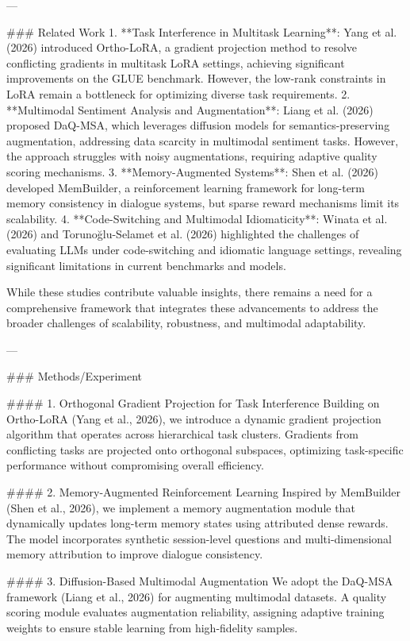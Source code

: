 ---

### Related Work  
1. **Task Interference in Multitask Learning**: Yang et al. (2026) introduced Ortho-LoRA, a gradient projection method to resolve conflicting gradients in multitask LoRA settings, achieving significant improvements on the GLUE benchmark. However, the low-rank constraints in LoRA remain a bottleneck for optimizing diverse task requirements.  
2. **Multimodal Sentiment Analysis and Augmentation**: Liang et al. (2026) proposed DaQ-MSA, which leverages diffusion models for semantics-preserving augmentation, addressing data scarcity in multimodal sentiment tasks. However, the approach struggles with noisy augmentations, requiring adaptive quality scoring mechanisms.  
3. **Memory-Augmented Systems**: Shen et al. (2026) developed MemBuilder, a reinforcement learning framework for long-term memory consistency in dialogue systems, but sparse reward mechanisms limit its scalability.  
4. **Code-Switching and Multimodal Idiomaticity**: Winata et al. (2026) and Torunoğlu-Selamet et al. (2026) highlighted the challenges of evaluating LLMs under code-switching and idiomatic language settings, revealing significant limitations in current benchmarks and models.  

While these studies contribute valuable insights, there remains a need for a comprehensive framework that integrates these advancements to address the broader challenges of scalability, robustness, and multimodal adaptability.

---

### Methods/Experiment  

#### 1. Orthogonal Gradient Projection for Task Interference  
Building on Ortho-LoRA (Yang et al., 2026), we introduce a dynamic gradient projection algorithm that operates across hierarchical task clusters. Gradients from conflicting tasks are projected onto orthogonal subspaces, optimizing task-specific performance without compromising overall efficiency.

#### 2. Memory-Augmented Reinforcement Learning  
Inspired by MemBuilder (Shen et al., 2026), we implement a memory augmentation module that dynamically updates long-term memory states using attributed dense rewards. The model incorporates synthetic session-level questions and multi-dimensional memory attribution to improve dialogue consistency.

#### 3. Diffusion-Based Multimodal Augmentation  
We adopt the DaQ-MSA framework (Liang et al., 2026) for augmenting multimodal datasets. A quality scoring module evaluates augmentation reliability, assigning adaptive training weights to ensure stable learning from high-fidelity samples.

